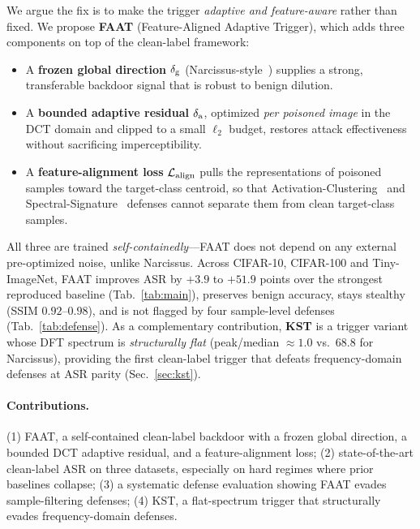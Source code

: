 We argue the fix is to make the trigger \emph{adaptive and feature-aware} rather
than fixed. We propose \textbf{FAAT} (Feature-Aligned Adaptive Trigger), which
adds three components on top of the clean-label framework:
\begin{itemize}[leftmargin=*,topsep=2pt,itemsep=1pt]
  \item A \textbf{frozen global direction} $\delta_{\mathrm{g}}$ (Narcissus-style~\cite{zeng2023narcissus})
        supplies a strong, transferable backdoor signal that is robust to benign dilution.
  \item A \textbf{bounded adaptive residual} $\delta_{\mathrm{a}}$, optimized \emph{per poisoned
        image} in the DCT domain and clipped to a small $\ell_2$ budget, restores
        attack effectiveness without sacrificing imperceptibility.
  \item A \textbf{feature-alignment loss} $\mathcal{L}_{\mathrm{align}}$ pulls the representations of
        poisoned samples toward the target-class centroid, so that
        Activation-Clustering~\cite{chen2018activation} and
        Spectral-Signature~\cite{tran2018spectral} defenses cannot separate them
        from clean target-class samples.
\end{itemize}
All three are trained \emph{self-containedly}---FAAT does not depend on any
external pre-optimized noise, unlike Narcissus. Across CIFAR-10, CIFAR-100 and
Tiny-ImageNet, FAAT improves ASR by $+3.9$ to $+51.9$ points over the strongest
reproduced baseline (Tab.~\ref{tab:main}), preserves benign accuracy, stays
stealthy (SSIM $0.92$--$0.98$), and is not flagged by four sample-level defenses
(Tab.~\ref{tab:defense}). As a complementary contribution, \textbf{KST} is a
trigger variant whose DFT spectrum is \emph{structurally flat}
(peak/median $\approx\!1.0$ vs.\ $68.8$ for Narcissus), providing the first
clean-label trigger that defeats frequency-domain defenses at ASR parity
(Sec.~\ref{sec:kst}).

\paragraph{Contributions.} (1) FAAT, a self-contained clean-label backdoor with
a frozen global direction, a bounded DCT adaptive residual, and a
feature-alignment loss; (2) state-of-the-art clean-label ASR on three datasets,
especially on hard regimes where prior baselines collapse; (3) a systematic
defense evaluation showing FAAT evades sample-filtering defenses; (4) KST, a
flat-spectrum trigger that structurally evades frequency-domain
defenses.


